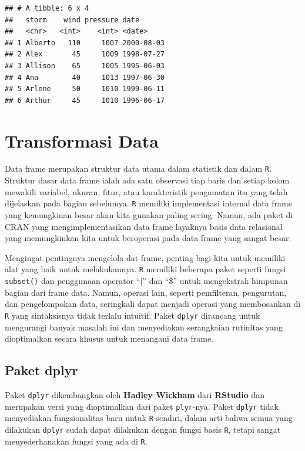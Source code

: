 \documentclass[]{book}
\begin{document}
\begin{verbatim}
## # A tibble: 6 x 4
##   storm    wind pressure date      
##   <chr>   <int>    <int> <date>    
## 1 Alberto   110     1007 2000-08-03
## 2 Alex       45     1009 1998-07-27
## 3 Allison    65     1005 1995-06-03
## 4 Ana        40     1013 1997-06-30
## 5 Arlene     50     1010 1999-06-11
## 6 Arthur     45     1010 1996-06-17
\end{verbatim}

\section{Transformasi Data}\label{transformasi-data}

Data frame merupakan struktur data utama dalam statistik dan dalam
\texttt{R}. Struktur dasar data frame ialah ada satu observasi tiap
baris dan setiap kolom mewakili variabel, ukuran, fitur, atau
karakteristik pengamatan itu yang telah dijelaskan pada bagian
sebelumya. \texttt{R} memiliki implementasi internal data frame yang
kemungkinan besar akan kita gunakan paling sering. Namun, ada paket di
CRAN yang mengimplementasikan data frame layaknya basis data relasional
yang memungkinkan kita untuk beroperasi pada data frame yang sangat
besar.

Mengingat pentingnya mengelola dat frame, penting bagi kita untuk
memiliki alat yang baik untuk melakukannya. \texttt{R} memiliki beberapa
paket seperti fungsi \texttt{subset()} dan penggunaan operator ``{[}''
dan ``\$'' untuk mengekstrak himpunan bagian dari frame data. Namun,
operasi lain, seperti pemfilteran, pengurutan, dan pengelompokan data,
seringkali dapat menjadi operasi yang membosankan di \texttt{R} yang
sintaksisnya tidak terlalu intuitif. Paket \texttt{dplyr} dirancang
untuk mengurangi banyak masalah ini dan menyediakan serangkaian
rutinitas yang dioptimalkan secara khusus untuk menangani data frame.

\subsection{Paket dplyr}\label{paket-dplyr}

Paket \texttt{dplyr} dikembangkan oleh \textbf{Hadley Wickham} dari
\textbf{RStudio} dan merupakan versi yang dioptimalkan dari paket
\texttt{plyr}-nya. Paket \texttt{dplyr} tidak menyediakan fungsionalitas
baru untuk \texttt{R} sendiri, dalam arti bahwa semua yang dilakukan
\texttt{dplyr} sudah dapat dilakukan dengan fungsi basis \texttt{R},
tetapi sangat menyederhanakan fungsi yang ada di \texttt{R}.
\end{document}
